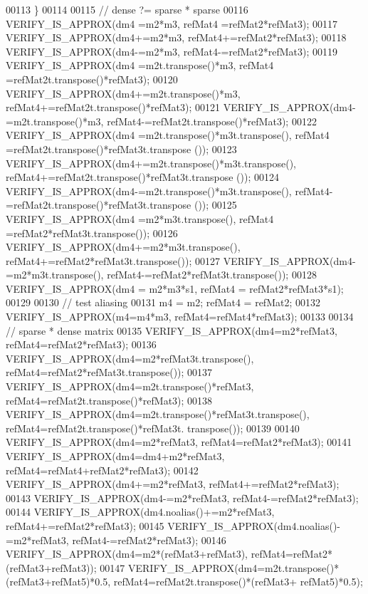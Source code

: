 \begin{DoxyCode}
00113     \}
00114 
00115     \textcolor{comment}{// dense ?= sparse * sparse}
00116     VERIFY\_IS\_APPROX(dm4 =m2*m3, refMat4 =refMat2*refMat3);
00117     VERIFY\_IS\_APPROX(dm4+=m2*m3, refMat4+=refMat2*refMat3);
00118     VERIFY\_IS\_APPROX(dm4-=m2*m3, refMat4-=refMat2*refMat3);
00119     VERIFY\_IS\_APPROX(dm4 =m2t.transpose()*m3, refMat4 =refMat2t.transpose()*refMat3);
00120     VERIFY\_IS\_APPROX(dm4+=m2t.transpose()*m3, refMat4+=refMat2t.transpose()*refMat3);
00121     VERIFY\_IS\_APPROX(dm4-=m2t.transpose()*m3, refMat4-=refMat2t.transpose()*refMat3);
00122     VERIFY\_IS\_APPROX(dm4 =m2t.transpose()*m3t.transpose(), refMat4 =refMat2t.transpose()*refMat3t.transpose
      ());
00123     VERIFY\_IS\_APPROX(dm4+=m2t.transpose()*m3t.transpose(), refMat4+=refMat2t.transpose()*refMat3t.transpose
      ());
00124     VERIFY\_IS\_APPROX(dm4-=m2t.transpose()*m3t.transpose(), refMat4-=refMat2t.transpose()*refMat3t.transpose
      ());
00125     VERIFY\_IS\_APPROX(dm4 =m2*m3t.transpose(), refMat4 =refMat2*refMat3t.transpose());
00126     VERIFY\_IS\_APPROX(dm4+=m2*m3t.transpose(), refMat4+=refMat2*refMat3t.transpose());
00127     VERIFY\_IS\_APPROX(dm4-=m2*m3t.transpose(), refMat4-=refMat2*refMat3t.transpose());
00128     VERIFY\_IS\_APPROX(dm4 = m2*m3*s1, refMat4 = refMat2*refMat3*s1);
00129 
00130     \textcolor{comment}{// test aliasing}
00131     m4 = m2; refMat4 = refMat2;
00132     VERIFY\_IS\_APPROX(m4=m4*m3, refMat4=refMat4*refMat3);
00133 
00134     \textcolor{comment}{// sparse * dense matrix}
00135     VERIFY\_IS\_APPROX(dm4=m2*refMat3, refMat4=refMat2*refMat3);
00136     VERIFY\_IS\_APPROX(dm4=m2*refMat3t.transpose(), refMat4=refMat2*refMat3t.transpose());
00137     VERIFY\_IS\_APPROX(dm4=m2t.transpose()*refMat3, refMat4=refMat2t.transpose()*refMat3);
00138     VERIFY\_IS\_APPROX(dm4=m2t.transpose()*refMat3t.transpose(), refMat4=refMat2t.transpose()*refMat3t.
      transpose());
00139 
00140     VERIFY\_IS\_APPROX(dm4=m2*refMat3, refMat4=refMat2*refMat3);
00141     VERIFY\_IS\_APPROX(dm4=dm4+m2*refMat3, refMat4=refMat4+refMat2*refMat3);
00142     VERIFY\_IS\_APPROX(dm4+=m2*refMat3, refMat4+=refMat2*refMat3);
00143     VERIFY\_IS\_APPROX(dm4-=m2*refMat3, refMat4-=refMat2*refMat3);
00144     VERIFY\_IS\_APPROX(dm4.noalias()+=m2*refMat3, refMat4+=refMat2*refMat3);
00145     VERIFY\_IS\_APPROX(dm4.noalias()-=m2*refMat3, refMat4-=refMat2*refMat3);
00146     VERIFY\_IS\_APPROX(dm4=m2*(refMat3+refMat3), refMat4=refMat2*(refMat3+refMat3));
00147     VERIFY\_IS\_APPROX(dm4=m2t.transpose()*(refMat3+refMat5)*0.5, refMat4=refMat2t.transpose()*(refMat3+
      refMat5)*0.5);

\end{DoxyCode}
